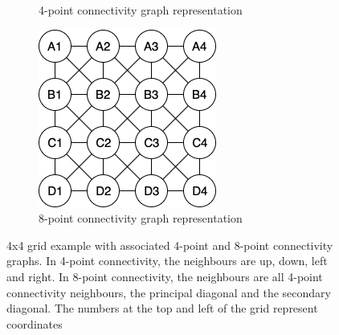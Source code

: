 \begin{figure}[h!]
\begin{subfigure}[b]{0.18\linewidth}
    \caption{4-point connectivity graph representation}
  \end{subfigure}
  \hfill
  \begin{subfigure}[b]{0.18\linewidth}
    \includegraphics[width=\linewidth]{images/8_way_graph.png}
    \caption{8-point connectivity graph representation}
  \end{subfigure}
  \caption{4x4 grid example with associated 4-point and 8-point connectivity graphs. In 4-point connectivity, the neighbours are up, down, left and right. In 8-point connectivity, the neighbours are all 4-point connectivity neighbours, the principal diagonal and the secondary diagonal. The numbers at the top and left of the grid represent coordinates}
  \label{fig:grids}
\end{figure}

